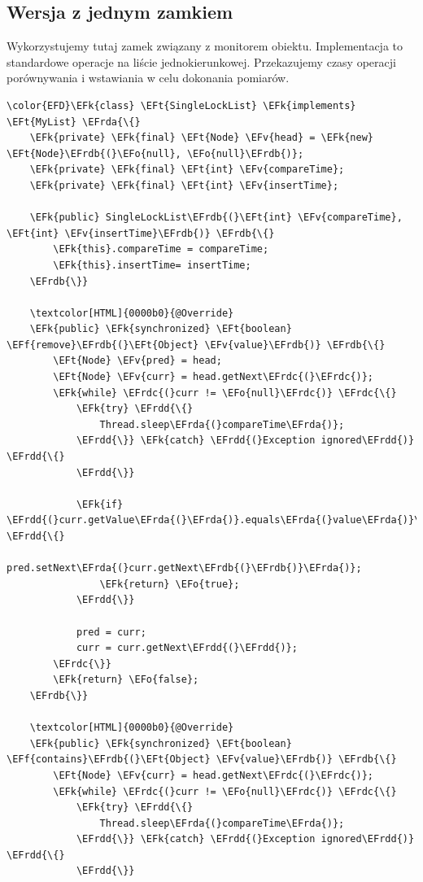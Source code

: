 \documentclass[11pt]{article}
\newcommand{\EFk}[1]{\textcolor{EFk}{#1}} %
\newcommand{\EFf}[1]{\textcolor{EFf}{#1}} %
\newcommand{\EFv}[1]{\textcolor{EFv}{#1}} %
\newcommand{\EFt}[1]{\textcolor{EFt}{#1}} %
\newcommand{\EFo}[1]{\textcolor{EFo}{#1}} %
\newcommand{\EFrda}[1]{#1} %
\newcommand{\EFrdb}[1]{\textcolor{EFrdb}{#1}} %
\newcommand{\EFrdc}[1]{\textcolor{EFrdc}{#1}} %
\newcommand{\EFrdd}[1]{\textcolor{EFrdd}{#1}} %
\begin{document}
\subsection*{Wersja z jednym zamkiem}
\label{sec:org9d274be}
Wykorzystujemy tutaj zamek związany z monitorem obiektu.
Implementacja to standardowe operacje na liście jednokierunkowej.
Przekazujemy czasy operacji porównywania i wstawiania w celu dokonania pomiarów.

\begin{Code}
\begin{Verbatim}
\color{EFD}\EFk{class} \EFt{SingleLockList} \EFk{implements} \EFt{MyList} \EFrda{\{}
    \EFk{private} \EFk{final} \EFt{Node} \EFv{head} = \EFk{new} \EFt{Node}\EFrdb{(}\EFo{null}, \EFo{null}\EFrdb{)};
    \EFk{private} \EFk{final} \EFt{int} \EFv{compareTime};
    \EFk{private} \EFk{final} \EFt{int} \EFv{insertTime};

    \EFk{public} SingleLockList\EFrdb{(}\EFt{int} \EFv{compareTime}, \EFt{int} \EFv{insertTime}\EFrdb{)} \EFrdb{\{}
        \EFk{this}.compareTime = compareTime;
        \EFk{this}.insertTime= insertTime;
    \EFrdb{\}}

    \textcolor[HTML]{0000b0}{@Override}
    \EFk{public} \EFk{synchronized} \EFt{boolean} \EFf{remove}\EFrdb{(}\EFt{Object} \EFv{value}\EFrdb{)} \EFrdb{\{}
        \EFt{Node} \EFv{pred} = head;
        \EFt{Node} \EFv{curr} = head.getNext\EFrdc{(}\EFrdc{)};
        \EFk{while} \EFrdc{(}curr != \EFo{null}\EFrdc{)} \EFrdc{\{}
            \EFk{try} \EFrdd{\{}
                Thread.sleep\EFrda{(}compareTime\EFrda{)};
            \EFrdd{\}} \EFk{catch} \EFrdd{(}Exception ignored\EFrdd{)} \EFrdd{\{}
            \EFrdd{\}}

            \EFk{if} \EFrdd{(}curr.getValue\EFrda{(}\EFrda{)}.equals\EFrda{(}value\EFrda{)}\EFrdd{)} \EFrdd{\{}
                pred.setNext\EFrda{(}curr.getNext\EFrdb{(}\EFrdb{)}\EFrda{)};
                \EFk{return} \EFo{true};
            \EFrdd{\}}

            pred = curr;
            curr = curr.getNext\EFrdd{(}\EFrdd{)};
        \EFrdc{\}}
        \EFk{return} \EFo{false};
    \EFrdb{\}}

    \textcolor[HTML]{0000b0}{@Override}
    \EFk{public} \EFk{synchronized} \EFt{boolean} \EFf{contains}\EFrdb{(}\EFt{Object} \EFv{value}\EFrdb{)} \EFrdb{\{}
        \EFt{Node} \EFv{curr} = head.getNext\EFrdc{(}\EFrdc{)};
        \EFk{while} \EFrdc{(}curr != \EFo{null}\EFrdc{)} \EFrdc{\{}
            \EFk{try} \EFrdd{\{}
                Thread.sleep\EFrda{(}compareTime\EFrda{)};
            \EFrdd{\}} \EFk{catch} \EFrdd{(}Exception ignored\EFrdd{)} \EFrdd{\{}
            \EFrdd{\}}


\end{Verbatim}
\end{Code}
\end{document}

